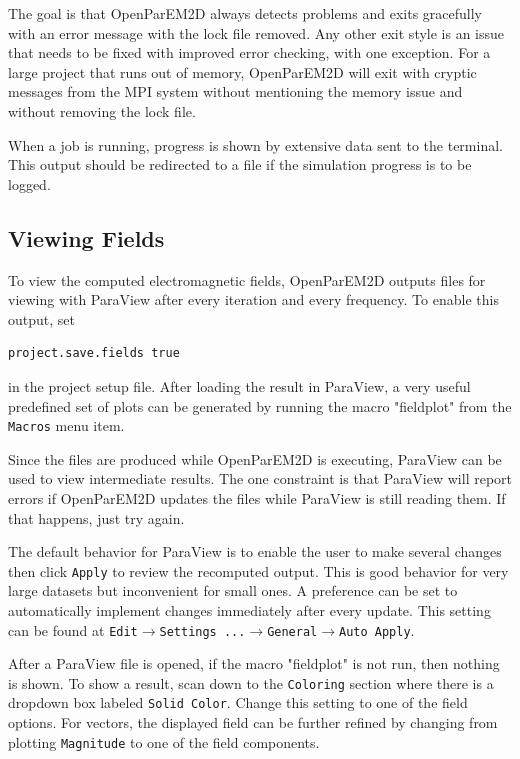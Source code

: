 \documentclass[titlepage]{article}
\renewcommand\_{\textunderscore\linebreak[1]}
\begin{document}
The goal is that OpenParEM2D always detects problems and exits gracefully with an error message with the lock file removed.  Any other exit style is an issue that needs to be fixed with improved error checking, with one exception.  For a large project that runs out of memory, OpenParEM2D will exit with cryptic messages from the MPI system without mentioning the memory issue and without removing the lock file.

When a job is running, progress is shown by extensive data sent to the terminal.  This output should be redirected to a file if the simulation progress is to be logged.

\subsection{Viewing Fields}

To view the computed electromagnetic fields, OpenParEM2D outputs files for viewing with ParaView after every iteration and every frequency.  To enable this output, set
\begin{Verbatim}[fontsize=\small]
  project.save.fields true
\end{Verbatim}
\noindent in the project setup file.  After loading the result in ParaView, a very useful predefined set of plots can be generated by running the macro "field\_plot" from the \texttt{Macros} menu item.

Since the files are produced while OpenParEM2D is executing, ParaView can be used to view intermediate results.  The one constraint is that ParaView will report errors if OpenParEM2D updates the files while ParaView is still reading them.  If that happens, just try again.

The default behavior for ParaView is to enable the user to make several changes then click \texttt{Apply} to review the recomputed output.  This is good behavior for very large datasets but inconvenient for small ones.  A preference can be set to automatically implement changes immediately after every update.  This setting can be found at \texttt{Edit}$\rightarrow$\texttt{Settings ...}$\rightarrow$\texttt{General}$\rightarrow$\texttt{Auto Apply}.

After a ParaView file is opened, if the macro "field\_plot" is not run, then nothing is shown.  To show a result, scan down to the \texttt{Coloring} section where there is a dropdown box labeled \texttt{Solid Color}.  Change this setting to one of the field options.  For vectors, the displayed field can be further refined by changing from plotting \texttt{Magnitude} to one of the field components.
\end{document}
